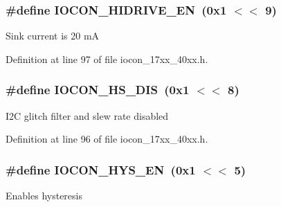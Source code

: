 \subsubsection[{\texorpdfstring{I\+O\+C\+O\+N\+\_\+\+H\+I\+D\+R\+I\+V\+E\+\_\+\+EN}{IOCON_HIDRIVE_EN}}]{\setlength{\rightskip}{0pt plus 5cm}\#define I\+O\+C\+O\+N\+\_\+\+H\+I\+D\+R\+I\+V\+E\+\_\+\+EN~(0x1 $<$$<$ 9)}\hypertarget{group__IOCON__17XX__40XX_gadaa6e6eca0d7d555f4f0816aa83dc8f3}{}\label{group__IOCON__17XX__40XX_gadaa6e6eca0d7d555f4f0816aa83dc8f3}
Sink current is 20 mA 

Definition at line 97 of file iocon\+\_\+17xx\+\_\+40xx.\+h.

\subsubsection[{\texorpdfstring{I\+O\+C\+O\+N\+\_\+\+H\+S\+\_\+\+D\+IS}{IOCON_HS_DIS}}]{\setlength{\rightskip}{0pt plus 5cm}\#define I\+O\+C\+O\+N\+\_\+\+H\+S\+\_\+\+D\+IS~(0x1 $<$$<$ 8)}\hypertarget{group__IOCON__17XX__40XX_gab2c8963063faa2ee583ad54750b842fa}{}\label{group__IOCON__17XX__40XX_gab2c8963063faa2ee583ad54750b842fa}
I2C glitch filter and slew rate disabled 

Definition at line 96 of file iocon\+\_\+17xx\+\_\+40xx.\+h.

\subsubsection[{\texorpdfstring{I\+O\+C\+O\+N\+\_\+\+H\+Y\+S\+\_\+\+EN}{IOCON_HYS_EN}}]{\setlength{\rightskip}{0pt plus 5cm}\#define I\+O\+C\+O\+N\+\_\+\+H\+Y\+S\+\_\+\+EN~(0x1 $<$$<$ 5)}\hypertarget{group__IOCON__17XX__40XX_gafb7c408ac1f52b7b7e46fde3061fe0b7}{}\label{group__IOCON__17XX__40XX_gafb7c408ac1f52b7b7e46fde3061fe0b7}
Enables hysteresis 

